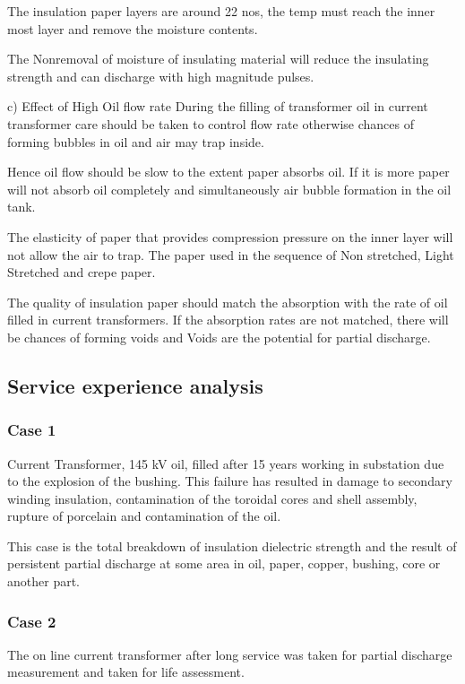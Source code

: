 The insulation paper layers are around 22 nos, the temp must reach the inner most layer and remove the moisture contents.

The Nonremoval of moisture of insulating material will reduce the insulating strength and can discharge with high magnitude pulses.

c) Effect of High Oil flow rate
During the filling of transformer oil in current transformer care should be taken to control flow rate otherwise chances of forming bubbles in oil and air may trap inside. 

Hence oil flow should be slow to the extent paper absorbs oil. If it is more paper will not absorb oil completely and simultaneously air bubble formation in the oil tank.

The elasticity of paper that provides compression pressure on the inner layer will not allow the air to trap. The paper used in the sequence of Non stretched, Light Stretched and crepe paper.

The quality of insulation paper should match the absorption with the rate of oil filled in current transformers. If the absorption rates are not matched, there will be chances of forming voids and Voids are the potential for partial discharge.

\subsection{Service experience analysis}

\subsubsection{Case 1}
Current Transformer, 145 kV oil, filled after 15 years working in substation due to the explosion of the bushing. This failure has resulted in damage to secondary winding insulation, contamination of the toroidal cores and shell assembly, rupture of porcelain and contamination of the oil.
 
This case is the total breakdown of insulation dielectric strength and the result of persistent partial discharge at some area in oil, paper, copper, bushing, core or another part. 

\subsubsection{Case 2}
The on line current transformer after long service was taken for partial discharge measurement and taken for life assessment. 

